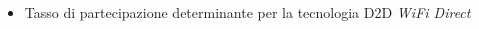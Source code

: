 \documentclass{beamer}
\begin{document}
\begin{frame}[shrink=50]
\begin{columns}
\begin{column}{0.45\textwidth}
\begin{figure}
    \end{figure}
    \begin{itemize}
      \item  Tasso di partecipazione determinante per la tecnologia D2D \textit{WiFi Direct}
    \end{itemize}
  \end{column}
\end{columns}
\end{frame}

\end{document}
